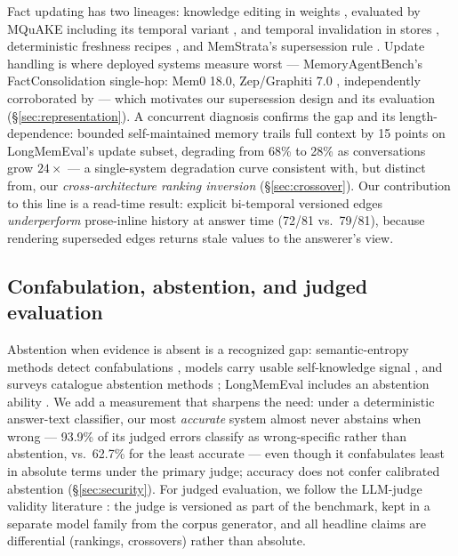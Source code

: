 Fact updating has two lineages: knowledge editing in weights
\citep[ROME/MEMIT;][]{meng2022rome,meng2023memit}, evaluated by MQuAKE
including its temporal variant \citep{zhong2023mquake}, and temporal
invalidation in stores \citep[Zep/Graphiti's bi-temporal
edges;][]{rasmussen2025zep}, deterministic freshness recipes
\citep{reddy2026freshness}, and MemStrata's supersession rule
\citep{yadav2026memstrata}. Update handling is where deployed systems
measure worst --- MemoryAgentBench's FactConsolidation single-hop: Mem0
18.0, Zep/Graphiti 7.0 \citep[v4, Table~3;][]{hu2026memoryagentbench},
independently corroborated by \citet{reddy2026freshness} --- which motivates
our supersession design and its evaluation (\S\ref{sec:representation}). A
concurrent diagnosis confirms the gap and its length-dependence: bounded
self-maintained memory trails full context by 15 points on LongMemEval's
update subset, degrading from 68\% to 28\% as conversations grow $24\times$
\citep{patel2026supersede} --- a single-system degradation curve consistent
with, but distinct from, our \emph{cross-architecture ranking inversion}
(\S\ref{sec:crossover}). Our contribution to this line is a read-time
result: explicit bi-temporal versioned edges \emph{underperform}
prose-inline history at answer time (72/81 vs.\ 79/81), because rendering
superseded edges returns stale values to the answerer's view.

\subsection{Confabulation, abstention, and judged evaluation}

Abstention when evidence is absent is a recognized gap: semantic-entropy
methods detect confabulations \citep{farquhar2024semantic}, models carry
usable self-knowledge signal \citep{kadavath2022know}, and surveys catalogue
abstention methods \citep{wen2024abstention}; LongMemEval includes an
abstention ability \citep{wu2024longmemeval}. We add a measurement that
sharpens the need: under a deterministic answer-text classifier, our most
\emph{accurate} system almost never abstains when wrong --- 93.9\% of its
judged errors classify as wrong-specific rather than abstention, vs.\
62.7\% for the least accurate --- even though it confabulates least in
absolute terms under the primary judge; accuracy does not confer
calibrated abstention (\S\ref{sec:security}). For judged
evaluation, we follow the LLM-judge validity literature
\citep{zheng2023judging,wang2024notfair}: the judge is versioned as part of
the benchmark, kept in a separate model family from the corpus generator,
and all headline claims are differential (rankings, crossovers) rather than
absolute.

